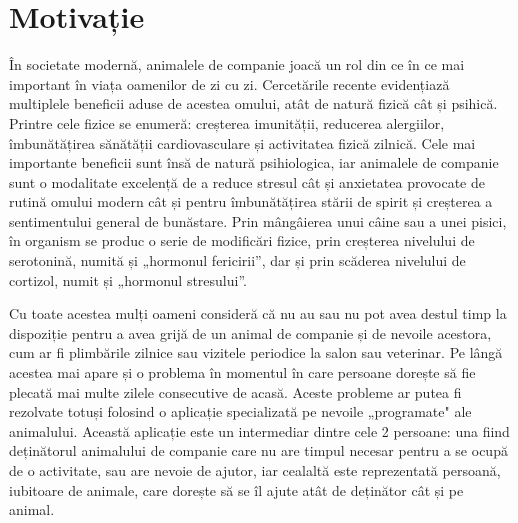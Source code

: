 \chapter*{Motivație} 

În societate modernă, animalele de companie joacă un rol din ce în ce mai important în viața oamenilor de zi cu zi. Cercetările recente evidențiază multiplele beneficii aduse de acestea omului, atât de natură fizică cât și psihică. Printre cele fizice se enumeră: creșterea imunității, reducerea alergiilor, îmbunătățirea sănătății cardiovasculare și activitatea fizică zilnică. Cele mai importante beneficii sunt însă de natură psihiologica, iar animalele de companie sunt o modalitate excelență de a reduce stresul cât și anxietatea provocate de rutină omului modern cât și pentru îmbunătățirea stării de spirit și creșterea a sentimentului general de bunăstare. Prin mângâierea unui câine sau a unei pisici, în organism se produc o serie de modificări fizice, prin creșterea nivelului de serotonină, numită și „hormonul fericirii”, dar și prin scăderea nivelului de cortizol, numit și „hormonul stresului”.

Cu toate acestea mulți oameni consideră că nu au sau nu pot avea destul timp la dispoziție pentru a avea grijă de un animal de companie și de nevoile acestora, cum ar fi plimbările zilnice sau vizitele periodice la salon sau veterinar. Pe lângă acestea mai apare și o problema în momentul în care persoane dorește să fie plecată mai multe zilele consecutive de acasă. Aceste probleme ar putea fi rezolvate totuși folosind o aplicație specializată pe nevoile „programate" ale animalului. Această aplicație este un intermediar dintre cele 2 persoane: una fiind deținătorul animalului de companie care nu are timpul necesar pentru a se ocupă de o activitate, sau are nevoie de ajutor, iar cealaltă este reprezentată persoană, iubitoare de animale, care dorește să se îl ajute atât de deținător cât și pe animal.

